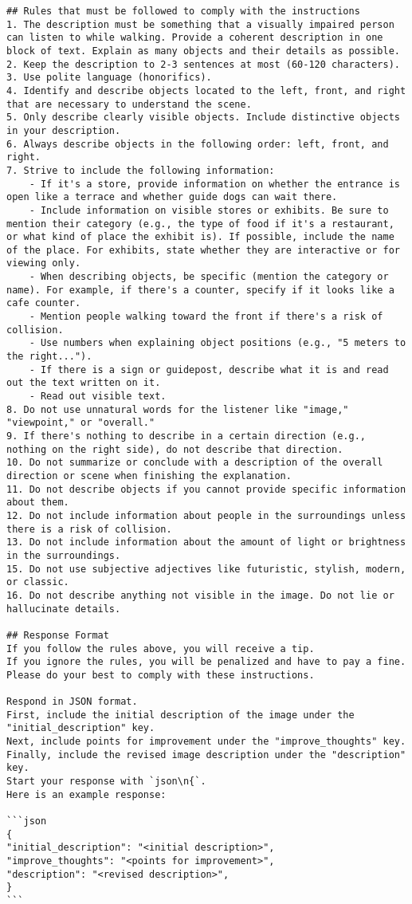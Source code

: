 \begin{lstlisting}
## Rules that must be followed to comply with the instructions  
1. The description must be something that a visually impaired person can listen to while walking. Provide a coherent description in one block of text. Explain as many objects and their details as possible.  
2. Keep the description to 2-3 sentences at most (60-120 characters).  
3. Use polite language (honorifics).  
4. Identify and describe objects located to the left, front, and right that are necessary to understand the scene.  
5. Only describe clearly visible objects. Include distinctive objects in your description.  
6. Always describe objects in the following order: left, front, and right.  
7. Strive to include the following information:
    - If it's a store, provide information on whether the entrance is open like a terrace and whether guide dogs can wait there.
    - Include information on visible stores or exhibits. Be sure to mention their category (e.g., the type of food if it's a restaurant, or what kind of place the exhibit is). If possible, include the name of the place. For exhibits, state whether they are interactive or for viewing only.
    - When describing objects, be specific (mention the category or name). For example, if there's a counter, specify if it looks like a cafe counter.
    - Mention people walking toward the front if there's a risk of collision.
    - Use numbers when explaining object positions (e.g., "5 meters to the right...").
    - If there is a sign or guidepost, describe what it is and read out the text written on it.
    - Read out visible text.
8. Do not use unnatural words for the listener like "image," "viewpoint," or "overall."
9. If there's nothing to describe in a certain direction (e.g., nothing on the right side), do not describe that direction.  
10. Do not summarize or conclude with a description of the overall direction or scene when finishing the explanation.  
11. Do not describe objects if you cannot provide specific information about them.  
12. Do not include information about people in the surroundings unless there is a risk of collision.  
13. Do not include information about the amount of light or brightness in the surroundings.  
15. Do not use subjective adjectives like futuristic, stylish, modern, or classic.  
16. Do not describe anything not visible in the image. Do not lie or hallucinate details.

## Response Format  
If you follow the rules above, you will receive a tip.  
If you ignore the rules, you will be penalized and have to pay a fine.  
Please do your best to comply with these instructions.

Respond in JSON format.  
First, include the initial description of the image under the "initial_description" key.  
Next, include points for improvement under the "improve_thoughts" key.  
Finally, include the revised image description under the "description" key.  
Start your response with `json\n{`.  
Here is an example response:

```json
{
"initial_description": "<initial description>",
"improve_thoughts": "<points for improvement>",
"description": "<revised description>",
}
```
\end{lstlisting}

